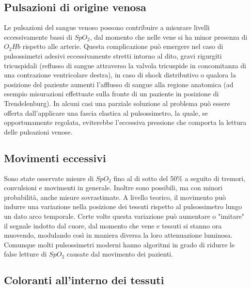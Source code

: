 \documentclass[a4paper, 12pt]{book}
\begin{document}
\subsection{Pulsazioni di origine venosa}

Le pulsazioni del sangue venoso possono contribuire a misurare livelli eccessivamente bassi di $SpO_2$, dal momento che nelle vene si ha minor presenza di $O_2Hb$ rispetto alle arterie.
Questa complicazione può emergere nel caso di pulsossimetri adesivi eccessivamente stretti intorno al dito, gravi rigurgiti tricuspidali (reflusso di sangue attraverso la valvola tricuspide in concomitanza di una contrazione ventricolare destra), in caso di shock distributivo o qualora la posizione del paziente aumenti l'afflusso di sangue alla regione anatomica (ad esempio misurazioni effettuate sulla fronte di un paziente in posizione di Trendelenburg).
In alcuni casi una parziale soluzione al problema può essere offerta dall'applicare una fascia elastica al pulsossimetro, la quale, se opportunamente regolata, eviterebbe l'eccessiva pressione che comporta la lettura delle pulsazioni venose.


\subsection{Movimenti eccessivi}

Sono state osservate misure di $SpO_2$ fino al di sotto del 50\% a seguito di tremori, convulsioni e movimenti in generale.
Inoltre sono possibili, ma con minori probabilità, anche misure sovrastimate.
A livello teorico, il movimento può indurre una variazione nella posizione dei tessuti rispetto al pulsossimetro lungo un dato arco temporale.
Certe volte questa variazione può aumentare o "imitare" il segnale indotto dal cuore, dal momento che vene e tessuti si stanno ora muovendo, modulando così in maniera diversa la loro attenuazione luminosa.
Comunque molti pulsossimetri moderni hanno algoritmi in grado di ridurre le false letture di $SpO_2$ causate dal movimento dei pazienti.


\subsection{Coloranti all'interno dei tessuti}
\end{document}
